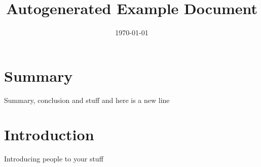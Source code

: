 \documentclass[a4paper]{article}%
\title{Autogenerated Example Document}%
\date{\today}%
\begin{document}
%
\normalsize%
\pagestyle{firstpage}%
\maketitle%
\newpage%
\tableofcontents%
\newpage%
\section{Summary}%
\label{sec:Summary}%
Summary, conclusion and stuff \newline%
 and here is a new line

%
\section{Introduction}%
\label{sec:Introduction}%
Introducing people to your stuff

%
\end{document}
